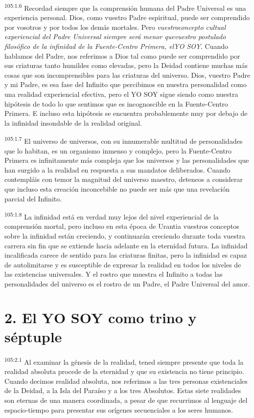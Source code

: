 \par
\textsuperscript{105:1.6} Recordad siempre que la comprensión humana del Padre Universal es una experiencia personal. Dios, como vuestro Padre espiritual, puede ser comprendido por vosotros y por todos los demás mortales. Pero \textit{vuestroconcepto cultual experiencial del Padre Universal siempre será menor quevuestro postulado filosófico de la infinidad de la Fuente-Centro Primera, elYO SOY}. Cuando hablamos del Padre, nos referimos a Dios tal como puede ser comprendido por sus criaturas tanto humildes como elevadas, pero la Deidad contiene muchas más cosas que son incomprensibles para las criaturas del universo. Dios, vuestro Padre y mi Padre, es esa fase del Infinito que percibimos en nuestra personalidad como una realidad experiencial efectiva, pero el YO SOY sigue siendo como nuestra hipótesis de todo lo que sentimos que es incognoscible en la Fuente-Centro Primera. E incluso esta hipótesis se encuentra probablemente muy por debajo de la infinidad insondable de la realidad original.

\par
\textsuperscript{105:1.7} El universo de universos, con su innumerable multitud de personalidades que lo habitan, es un organismo inmenso y complejo, pero la Fuente-Centro Primera es infinitamente más compleja que los universos y las personalidades que han surgido a la realidad en respuesta a sus mandatos deliberados. Cuando contempláis con temor la magnitud del universo maestro, deteneos a considerar que incluso esta creación inconcebible no puede ser más que una revelación parcial del Infinito.

\par
\textsuperscript{105:1.8} La infinidad está en verdad muy lejos del nivel experiencial de la comprensión mortal, pero incluso en esta época de Urantia vuestros conceptos sobre la infinidad están creciendo, y continuarán creciendo durante toda vuestra carrera sin fin que se extiende hacia adelante en la eternidad futura. La infinidad incalificada carece de sentido para las criaturas finitas, pero la infinidad es capaz de autolimitarse y es susceptible de expresar la realidad en todos los niveles de las existencias universales. Y el rostro que muestra el Infinito a todas las personalidades del universo es el rostro de un Padre, el Padre Universal del amor.

\section*{2. El YO SOY como trino y séptuple}
\par
\textsuperscript{105:2.1} Al examinar la génesis de la realidad, tened siempre presente que toda la realidad absoluta procede de la eternidad y que su existencia no tiene principio. Cuando decimos realidad absoluta, nos referimos a las tres personas existenciales de la Deidad, a la Isla del Paraíso y a los tres Absolutos. Estas siete realidades son eternas de una manera coordinada, a pesar de que recurrimos al lenguaje del espacio-tiempo para presentar sus orígenes secuenciales a los seres humanos.

